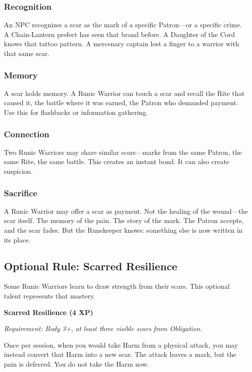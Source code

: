 \subsubsection{Recognition}

An NPC recognizes a scar as the mark of a specific Patron—or a specific crime. A Chain-Lantern prefect has seen that brand before. A Daughter of the Cord knows that tattoo pattern. A mercenary captain lost a finger to a warrior with that same scar.

\subsubsection{Memory}

A scar holds memory. A Runic Warrior can touch a scar and recall the Rite that caused it, the battle where it was earned, the Patron who demanded payment. Use this for flashbacks or information gathering.

\subsubsection{Connection}

Two Runic Warriors may share similar scars—marks from the same Patron, the same Rite, the same battle. This creates an instant bond. It can also create suspicion.

\subsubsection{Sacrifice}

A Runic Warrior may offer a scar as payment. Not the healing of the wound—the scar itself. The memory of the pain. The story of the mark. The Patron accepts, and the scar fades. But the Runekeeper knows: something else is now written in its place.

\subsection{Optional Rule: Scarred Resilience}

Some Runic Warriors learn to draw strength from their scars. This optional talent represents that mastery.

\textbf{Scarred Resilience (4 XP)}

\textit{Requirement: Body 3+, at least three visible scars from Obligation.}

Once per session, when you would take Harm from a physical attack, you may instead convert that Harm into a new scar. The attack leaves a mark, but the pain is deferred. You do not take the Harm now.

